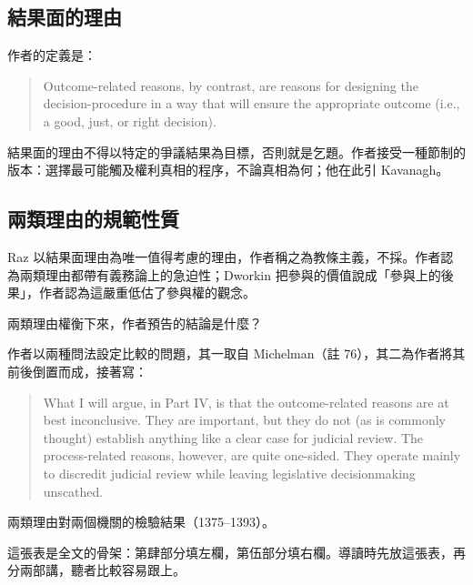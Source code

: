 \subsection{結果面的理由}

作者的定義是：

\begin{quote}
Outcome-related reasons, by contrast, are reasons for designing the decision-procedure in a way that will ensure the appropriate outcome (i.e., a good, just, or right decision).
\end{quote}

結果面的理由不得以特定的爭議結果為目標，否則就是乞題。作者接受一種節制的版本：選擇最可能觸及權利真相的程序，不論真相為何；他在此引 Kavanagh。

\subsection{兩類理由的規範性質}

Raz 以結果面理由為唯一值得考慮的理由，作者稱之為教條主義，不採。作者認為兩類理由都帶有義務論上的急迫性；Dworkin 把參與的價值說成「參與上的後果」，作者認為這嚴重低估了參與權的觀念。


\begin{qaquestion}
兩類理由權衡下來，作者預告的結論是什麼？
\end{qaquestion}

作者以兩種問法設定比較的問題，其一取自 Michelman（註 76），其二為作者將其前後倒置而成，接著寫：

\begin{quote}
What I will argue, in Part IV, is that the outcome-related reasons are at best inconclusive. They are important, but they do not (as is commonly thought) establish anything like a clear case for judicial review. The process-related reasons, however, are quite one-sided. They operate mainly to discredit judicial review while leaving legislative decisionmaking unscathed.
\end{quote}

\begin{qafigure}{兩類理由對兩個機關的檢驗結果（1375--1393）。\label{fig:reasons}}

\end{qafigure}

\begin{readernote}
這張表是全文的骨架：第肆部分填左欄，第伍部分填右欄。導讀時先放這張表，再分兩部講，聽者比較容易跟上。
\end{readernote}
